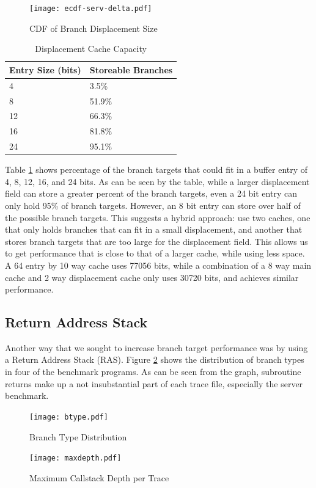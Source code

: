 \documentclass[twocolumn]{article}
\newcommand{\centerimage}[3]{
\begin{figure}[ht!]  
\begin{center} #1
\caption{#2}
\label{#3}
\end{center}
\end{figure}}
\begin{document}
\centerimage{\texttt{[image: ecdf-serv-delta.pdf]}}{CDF
  of Branch Displacement Size}{ddelta}


\begin{table}\begin{center}\begin{tabular}{ll}

Entry Size (bits) & Storeable Branches \\
\hline
4 & 3.5\% \\
8 & 51.9\% \\
12 & 66.3\% \\
16 & 81.8\% \\
24 & 95.1\% 
\end{tabular}\end{center}
\caption{Displacement Cache Capacity}
\label{dtable}
\end{table}

Table \ref{dtable} shows percentage of the branch targets that could
fit in a buffer entry of 4, 8, 12, 16, and 24 bits. As can be seen by
the table, while a larger displacement field can store a greater
percent of the branch targets, even a 24 bit entry can only hold 95\%
of branch targets. However, an 8 bit entry can store over half of the
possible branch targets. This suggests a hybrid approach: use two
caches, one that only holds branches that can fit in a small
displacement, and another that stores branch targets that are too
large for the displacement field. This allows us to get performance
that is close to that of a larger cache, while using less space. A 64
entry by 10 way cache uses 77056 bits, while a combination of a 8 way
main cache and 2 way displacement cache only uses 30720 bits, and
achieves similar performance.

\subsection{Return Address Stack}
Another way that we sought to increase branch target performance was
by using a Return Address Stack (RAS). Figure \ref{btype} shows the
distribution of branch types in four of the benchmark programs. As can
be seen from the graph, subroutine returns make up a not insubstantial
part of each trace file, especially the server benchmark. 

\centerimage{\texttt{[image: btype.pdf]}}{Branch Type Distribution}{btype}

\centerimage{\texttt{[image: maxdepth.pdf]}}{Maximum
  Callstack Depth per Trace}{maxdepth}
\end{document}
